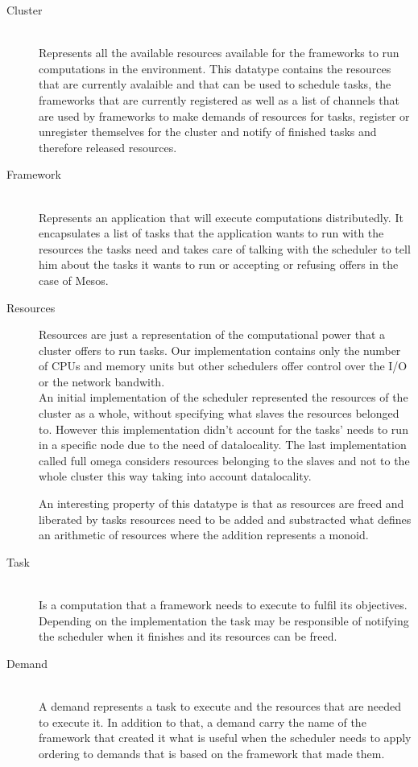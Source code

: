 \documentclass{svjour3}                     %
\begin{document}
\begin{description}
  \item[Cluster] \hfill \\
  Represents all the available resources available for the frameworks
  to run computations in the environment. This datatype contains the
  resources that are currently avalaible and that can be used to
  schedule tasks, the frameworks that are currently registered as well
  as a list of channels that are used by frameworks to make demands of
  resources for tasks, register or unregister themselves for the
  cluster and notify of finished tasks and therefore released resources.
  \item[Framework] \hfill \\
  Represents an application that will execute computations
  distributedly. It encapsulates a list of tasks that the application
  wants to run with the resources the tasks need and takes care of
  talking with the scheduler to tell him about the tasks it wants to
  run or accepting or refusing offers in the case of Mesos.
  \item[Resources]
  Resources are just a representation of the computational power that
  a cluster offers to run tasks. Our implementation contains only the
  number of CPUs and memory units but other schedulers offer control
  over the I/O or the network bandwith. \\

  An initial implementation of the scheduler represented the resources
  of the cluster as a whole, without specifying what slaves the
  resources belonged to. However this implementation didn't account
  for the tasks' needs to run in a specific node due to the need of
  datalocality. The last implementation called full omega considers
  resources belonging to the slaves and not to the whole cluster this
  way taking into account datalocality.
  
  An interesting property of this datatype is that as resources are
  freed and liberated by tasks resources need to be added and
  substracted what defines an arithmetic of resources where the
  addition represents a monoid.
  \item[Task] \hfill \\
  Is a computation that a framework needs to execute to fulfil its
  objectives. Depending on the implementation the task may be
  responsible of notifying the scheduler when it finishes and its
  resources can be freed.
  \item[Demand] \hfill \\
  A demand represents a task to execute and the resources that are
  needed to execute it. In addition to that, a demand  carry the
  name of the framework that created it what is useful when the
  scheduler needs to apply ordering to demands that is based on the
  framework that made them.

\end{description}
\end{document}
